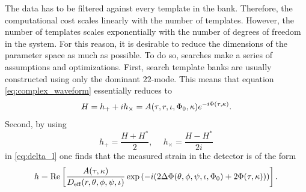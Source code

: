 The data has to be filtered against every template in the bank. Therefore, the computational cost scales linearly with the number of templates. However, the number of templates scales exponentially with the number of degrees of freedom in the system. For this reason, it is desirable to reduce the dimensions of the parameter space as much as possible. To do so, searches make a series of assumptions and optimizations. First, search template banks are usually constructed using only the dominant $22$-mode. This means that equation \eqref{eq:complex_waveform} essentially reduces to
\begin{equation}
H = h_+ + i h_\times = A{\left( \tau, r, \iota, \Phi_0, \kappa \right)} e^{-i\Phi{\left( \tau, \kappa \right)}}.
\end{equation}
Second, by using
\begin{equation}
h_+ = \frac{H + H^\ast}{2},\ \quad
h_\times = \frac{H - H^\ast}{2i}
\end{equation}
in \eqref{eq:delta_l} one finds that the measured strain in the detector is of the form~\cite{Allen:2005fk}
\begin{equation}\label{eq:qualitativ_detector_output}
h = \text{Re}\left[\frac{A{\left( \tau, \kappa \right)}}{D_\text{eff}{\left( r, \theta, \phi, \psi, \iota \right)}}\exp{\left( -i{\left( 2\Delta\Phi{\left( \theta, \phi, \psi, \iota, \Phi_0 \right)} + 2\Phi{\left( \tau, \kappa \right)} \right)} \right)}\right].
\end{equation}
